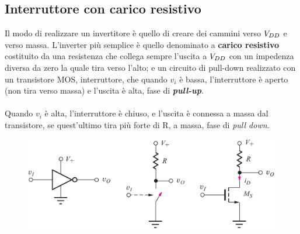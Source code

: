 

\subsection{Interruttore	con	carico	resistivo}

Il modo di realizzare un invertitore è quello di creare dei cammini verso $V_{DD}$ e verso massa. L'inverter più semplice è quello denominato a \textbf{carico resistivo} costituito da una resistenza che collega sempre l'uscita a $V_{DD}$ con un impedenza diversa da zero la quale tira verso l'alto; e un circuito di pull-down realizzato con un transistore 	MOS, interruttore, che quando $v_i$ è bassa, 	l’interruttore	è	aperto (non tira verso massa) e l'uscita è alta, fase di \textbf{\textit{pull-up}}.





\paragraph{}

Quando $v_i$ è	alta,	l’interruttore	è	chiuso,	e	l’uscita	è	connessa	a	
massa	dal	transistore, se quest'ultimo tira più forte di R, a massa, fase di \textit{pull down}.

\begin{figure}[htbp]
    \centering
    \includegraphics[width=0.55\linewidth]{img/interr_resist.png}
\end{figure}
